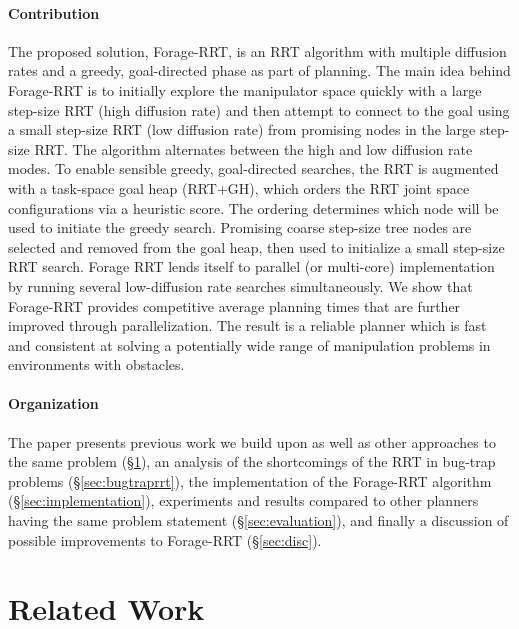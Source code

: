\documentclass[conference]{IEEEtran}
\begin{document}
\paragraph{Contribution}
The proposed solution, Forage-RRT, is an RRT algorithm with multiple 
diffusion rates and a greedy, goal-directed phase as part of planning.  
The main idea behind Forage-RRT is to initially explore the
manipulator space quickly with a large step-size RRT (high
diffusion rate) and then attempt to connect to the goal using a small
step-size RRT (low diffusion rate) from promising nodes in the large
step-size RRT. The algorithm alternates between the high and low diffusion
rate modes.  
To enable sensible greedy, goal-directed searches, the RRT is
augmented with a task-space goal heap (RRT+GH), which orders the RRT
joint space configurations via a heuristic score.  The ordering determines
which node will be used to initiate the greedy search.
Promising coarse step-size tree nodes are selected and removed from the goal 
heap, then used to initialize a small step-size RRT search.  
Forage RRT lends itself to parallel (or multi-core) implementation by
running several low-diffusion rate searches simultaneously.  We show that
Forage-RRT provides competitive average planning times that are further
improved through parallelization.  The result is a reliable planner which is
fast and consistent at solving a potentially wide range of manipulation
problems in environments with obstacles. 

\paragraph{Organization}
The paper presents previous work we build upon as well as other
approaches to the same problem (\S \ref{sec:related}), 
an analysis of the shortcomings of the RRT in bug-trap problems 
(\S \ref{sec:bugtraprrt}), 
the implementation of the Forage-RRT algorithm (\S \ref{sec:implementation}), 
experiments and results compared to other planners having the same problem 
statement (\S \ref{sec:evaluation}), and 
finally a discussion of possible improvements to Forage-RRT (\S \ref{sec:disc}).  
\section{Related Work}
\label{sec:related}
\end{document}
